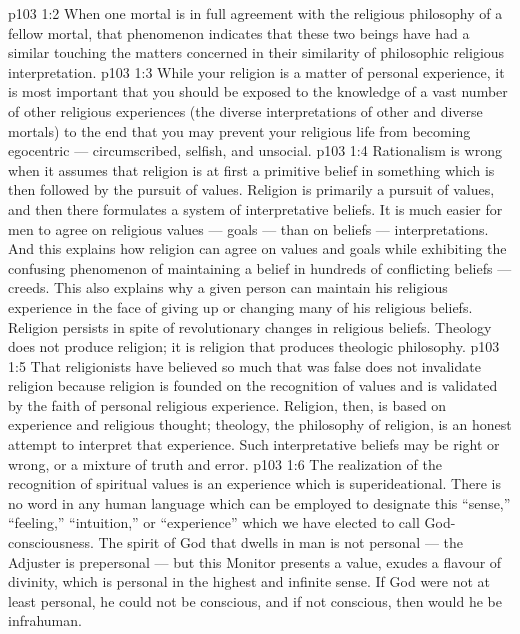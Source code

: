 \vs p103 1:2 When one mortal is in full agreement with the religious philosophy of a fellow mortal, that phenomenon indicates that these two beings have had a similar  touching the matters concerned in their similarity of philosophic religious interpretation.
\vs p103 1:3 While your religion is a matter of personal experience, it is most important that you should be exposed to the knowledge of a vast number of other religious experiences (the diverse interpretations of other and diverse mortals) to the end that you may prevent your religious life from becoming egocentric --- circumscribed, selfish, and unsocial.
\vs p103 1:4 Rationalism is wrong when it assumes that religion is at first a primitive belief in something which is then followed by the pursuit of values. Religion is primarily a pursuit of values, and then there formulates a system of interpretative beliefs. It is much easier for men to agree on religious values --- goals --- than on beliefs --- interpretations. And this explains how religion can agree on values and goals while exhibiting the confusing phenomenon of maintaining a belief in hundreds of conflicting beliefs --- creeds. This also explains why a given person can maintain his religious experience in the face of giving up or changing many of his religious beliefs. Religion persists in spite of revolutionary changes in religious beliefs. Theology does not produce religion; it is religion that produces theologic philosophy.
\vs p103 1:5 That religionists have believed so much that was false does not invalidate religion because religion is founded on the recognition of values and is validated by the faith of personal religious experience. Religion, then, is based on experience and religious thought; theology, the philosophy of religion, is an honest attempt to interpret that experience. Such interpretative beliefs may be right or wrong, or a mixture of truth and error.
\vs p103 1:6 The realization of the recognition of spiritual values is an experience which is superideational. There is no word in any human language which can be employed to designate this “sense,” “feeling,” “intuition,” or “experience” which we have elected to call God\hyp{}consciousness. The spirit of God that dwells in man is not personal --- the Adjuster is prepersonal --- but this Monitor presents a value, exudes a flavour of divinity, which is personal in the highest and infinite sense. If God were not at least personal, he could not be conscious, and if not conscious, then would he be infrahuman.
